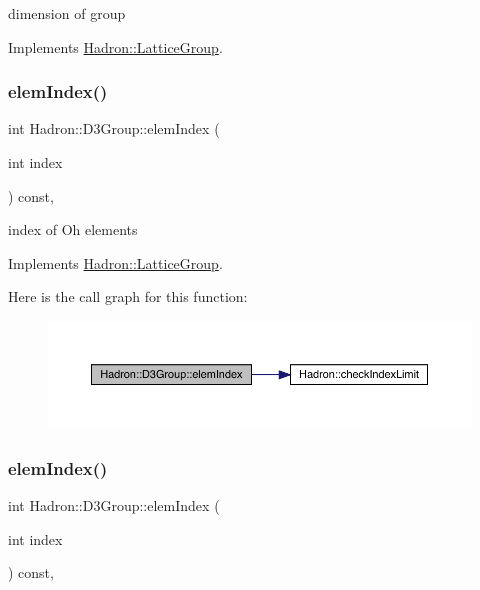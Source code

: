 dimension of group 

Implements \mbox{\hyperlink{structHadron_1_1LatticeGroup_abd8415698323796ef6a8605796ee3bea}{Hadron\+::\+Lattice\+Group}}.

\mbox{\label{structHadron_1_1D3Group_a90ac88df35dd8e919637917dc22ee903}} 
\subsubsection{\texorpdfstring{elemIndex()}{elemIndex()}\hspace{0.1cm}{\footnotesize\ttfamily [1/2]}}
{\footnotesize\ttfamily int Hadron\+::\+D3\+Group\+::elem\+Index (\begin{DoxyParamCaption}\item[{int}]{index }\end{DoxyParamCaption}) const\hspace{0.3cm}{\ttfamily [inline]}, {\ttfamily [virtual]}}

index of Oh elements 

Implements \mbox{\hyperlink{structHadron_1_1LatticeGroup_afb8e3ee60de059f75bce1044c694e1e8}{Hadron\+::\+Lattice\+Group}}.

Here is the call graph for this function\+:
\nopagebreak
\begin{figure}[H]
\begin{center}
\leavevmode
\includegraphics[width=350pt]{de/de1/structHadron_1_1D3Group_a90ac88df35dd8e919637917dc22ee903_cgraph}
\end{center}
\end{figure}
\mbox{\label{structHadron_1_1D3Group_a90ac88df35dd8e919637917dc22ee903}} 
\subsubsection{\texorpdfstring{elemIndex()}{elemIndex()}\hspace{0.1cm}{\footnotesize\ttfamily [2/2]}}
{\footnotesize\ttfamily int Hadron\+::\+D3\+Group\+::elem\+Index (\begin{DoxyParamCaption}\item[{int}]{index }\end{DoxyParamCaption}) const\hspace{0.3cm}{\ttfamily [inline]}, {\ttfamily [virtual]}}

